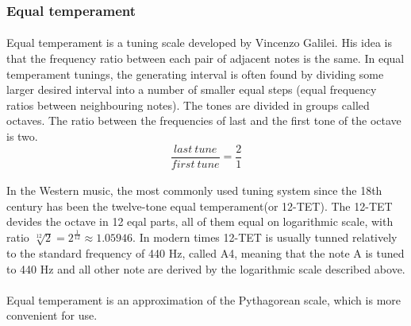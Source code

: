 \documentclass[]{article}
\begin{document}
            \subsubsection{Equal temperament}
            \paragraph{}Equal temperament is a tuning scale developed by Vincenzo Galilei. His idea is that the frequency ratio between each pair of adjacent notes is the same. In equal temperament tunings, the generating interval is often found by dividing some larger desired interval into a number of smaller equal steps (equal frequency ratios between neighbouring notes). The tones are divided in groups called octaves. The ratio between the frequencies of last and the first tone of the octave is two.
                $$\frac{last\ tune}{first\ tune} = \frac{2}{1}$$ \paragraph{}
                In the Western music, the most commonly used tuning system since the 18th century has been the twelve-tone equal temperament(or 12-TET)\cite{12tet}. The 12-TET devides the octave in 12 eqal parts, all of them equal on logarithmic scale, with ratio $\sqrt[12]{2} = 2^\frac{1}{12} \approx 1.05946$. In modern times 12-TET is usually tunned relatively to the standard frequency of 440 Hz, called A4, meaning that the note A is tuned to 440 Hz and all other note are derived by the logarithmic scale described above. \paragraph{}
                Equal temperament is an approximation of the Pythagorean scale, which is more convenient for use.\\
\end{document}
